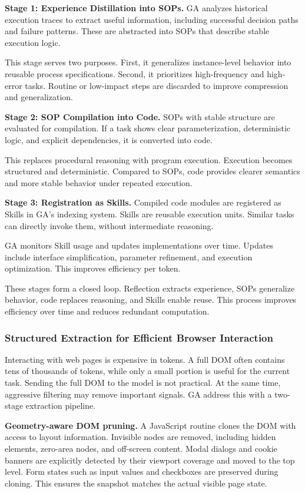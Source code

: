 \textbf{Stage 1: Experience Distillation into SOPs.} GA analyzes historical execution traces to extract useful information, including successful decision paths and failure patterns. These are abstracted into SOPs that describe stable execution logic.

This stage serves two purposes. First, it generalizes instance-level behavior into reusable process specifications. Second, it prioritizes high-frequency and high-error tasks. Routine or low-impact steps are discarded to improve compression and generalization.

\textbf{Stage 2: SOP Compilation into Code.} SOPs with stable structure are evaluated for compilation. If a task shows clear parameterization, deterministic logic, and explicit dependencies, it is converted into code.

This replaces procedural reasoning with program execution. Execution becomes structured and deterministic. Compared to SOPs, code provides clearer semantics and more stable behavior under repeated execution.

\textbf{Stage 3: Registration as Skills.} Compiled code modules are registered as Skills in GA’s indexing system. Skills are reusable execution units. Similar tasks can directly invoke them, without intermediate reasoning.

GA monitors Skill usage and updates implementations over time. Updates include interface simplification, parameter refinement, and execution optimization. This improves efficiency per token.

These stages form a closed loop. Reflection extracts experience, SOPs generalize behavior, code replaces reasoning, and Skills enable reuse. This process improves efficiency over time and reduces redundant computation. 

\subsubsection{Structured Extraction for Efficient Browser Interaction}
Interacting with web pages is expensive in tokens. A full DOM often contains tens of thousands of tokens, while only a small portion is useful for the current task. Sending the full DOM to the model is not practical. At the same time, aggressive filtering may remove important signals. GA address this with a two-stage extraction pipeline.

\textbf{Geometry-aware DOM pruning.} A JavaScript routine clones the DOM with access to layout information. Invisible nodes are removed, including hidden elements, zero-area nodes, and off-screen content. Modal dialogs and cookie banners are explicitly detected by their viewport coverage and moved to the top level. Form states such as input values and checkboxes are preserved during cloning. This ensures the snapshot matches the actual visible page state.

